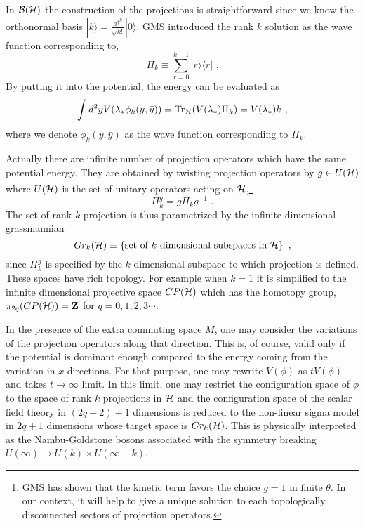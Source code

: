 \documentclass[a4paper,12pt]{article}
\begin{document}
In ${\cal B}({\cal H})$ the construction of the projections is straightforward
since we know the orthonormal basis $|k\rangle=\frac{{a^{\dagger}}^k}{
\sqrt{k!}}|0\rangle$. 
GMS introduced the  rank $k$ solution as the wave function
corresponding to,
\begin{equation}
 \Pi_k \equiv \sum_{r=0}^{k-1} |r\rangle \langle r|\,\,.
\end{equation}
By putting it into the potential, the energy
can be evaluated  as 
\begin{equation}
 \int d^2 y V(\lambda_* \phi_k(y,\bar y) ) =\mbox{Tr}_{\cal H}
 (V(\lambda_*) \Pi_k) = V(\lambda_*) k\,\,,
\end{equation}
where we denote $\phi_k(y,\bar y)$
as the wave function corresponding to $\Pi_k$.

Actually there are infinite number of projection operators
which have the same potential energy.  They are obtained by twisting
projection operators by $g\in U({\cal H})$ where $U({\cal H})$ is the 
set of unitary operators acting on ${\cal H}$,\footnote{
GMS has shown that the kinetic term
favors the choice $g=1$ in finite $\theta$.
In our context, it will help to give a unique
solution to each topologically disconnected
sectors of projection operators.
}
\begin{equation}
 \Pi^g_k=g\Pi_k g^{-1}\,\,.
\end{equation}
The set of rank $k$ projection is thus parametrized by the
infinite dimensional grassmannian 
\begin{equation}
Gr_{k}({\cal H})\equiv\left\{
\mbox{set of $k$ dimensional subspaces in }  {\cal H}
\right\}\,\,,
\end{equation}
since $\Pi^g_k$ is specified by the $k$-dimensional subspace
to which projection is defined.
These spaces have rich topology. 
For example when $k=1$ it is
simplified to the infinite dimensional projective space $CP({\cal H})$
which has the homotopy group, $\pi_{2q}(CP({\cal H}))={\bf Z}$
for $q=0,1,2,3\cdots$.

In the presence of the extra commuting space $M$,
one may consider the variations of the
projection operators along that direction.
This is, of course, valid only if the potential is 
dominant enough compared to the energy coming from
the variation in $x$ directions.
For that purpose, one may rewrite $V(\phi)$ as $t V(\phi)$
and takes $t\rightarrow \infty$ limit.
In this limit, one may restrict the configuration
space of $\phi$ to the space of rank $k$ projections in ${\cal H}$
and the configuration space of the scalar field theory in 
$(2q+2)+1$ dimensions is reduced to the non-linear
sigma model in $2q+1$ dimensions whose target space is $Gr_k({\cal H})$.
This is physically interpreted as the Nambu-Goldstone bosons 
associated with the symmetry breaking 
$U(\infty)\rightarrow U(k)\times U(\infty-k)$.
\end{document}
